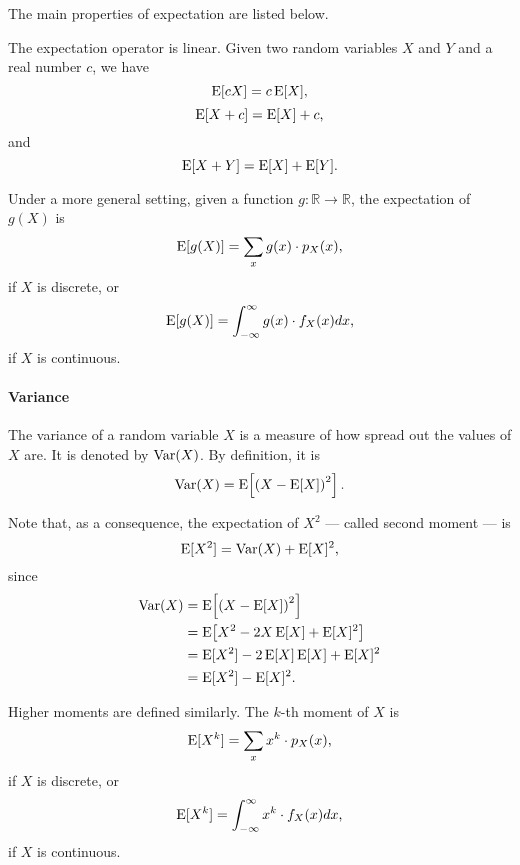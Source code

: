 The main properties of expectation are listed below.

The expectation operator is linear.  Given two random variables $X$ and $Y$ and a real
number $c$, we have
\begin{equation*}
  \operatorname{E}[c X] = c \operatorname{E}[X]\text{,}
\end{equation*}
\begin{equation*}
  \operatorname{E}[X + c] = \operatorname{E}[X] + c\text{,}
\end{equation*}
and
\begin{equation*}
  \operatorname{E}[X + Y] = \operatorname{E}[X] + \operatorname{E}[Y]\text{.}
\end{equation*}

Under a more general setting, given a function $g : \mathbb{R} \rightarrow \mathbb{R}$,
the expectation of $g(X)$ is
\begin{equation*}
  \operatorname{E}[g(X)] = \sum_{x} g(x) \cdot p_X(x)\text{,}
\end{equation*}
if $X$ is discrete, or
\begin{equation*}
  \operatorname{E}[g(X)] = \int_{-\infty}^{\infty} g(x) \cdot f_X(x) dx\text{,}
\end{equation*}
if $X$ is continuous.

\paragraph{Variance}  The variance of a random variable $X$ is a measure of how
spread out the values of $X$ are.  It is denoted by $\operatorname{Var}(X)$.  By definition, it is
\begin{equation}
  \label{eq:variance}
  \operatorname{Var}(X) = \operatorname{E}\!\left[\left(X - \operatorname{E}[X]\right)^2\right]\text{.}
\end{equation}

Note that, as a consequence, the expectation of $X^2$ --- called second moment --- is
\[
  \operatorname{E}[X^2] = \operatorname{Var}(X) + \operatorname{E}[X]^2\text{,}
\]
since
\begin{align*}
  \operatorname{Var}(X)
    &= \operatorname{E}\!\left[\left(X - \operatorname{E}[X]\right)^2\right] \\
    &= \operatorname{E}\!\left[X^2 - 2 X \operatorname{E}[X] + \operatorname{E}[X]^2\right] \\
    &= \operatorname{E}[X^2] - 2 \operatorname{E}[X] \operatorname{E}[X] + \operatorname{E}[X]^2 \\
    &= \operatorname{E}[X^2] - \operatorname{E}[X]^2\text{.}
\end{align*}

Higher moments are defined similarly.  The $k$-th moment of $X$ is
\begin{equation*}
  \operatorname{E}[X^k] = \sum_{x} x^k \cdot p_X(x)\text{,}
\end{equation*}
if $X$ is discrete, or
\begin{equation*}
  \operatorname{E}[X^k] = \int_{-\infty}^{\infty} x^k \cdot f_X(x) dx\text{,}
\end{equation*}
if $X$ is continuous.

